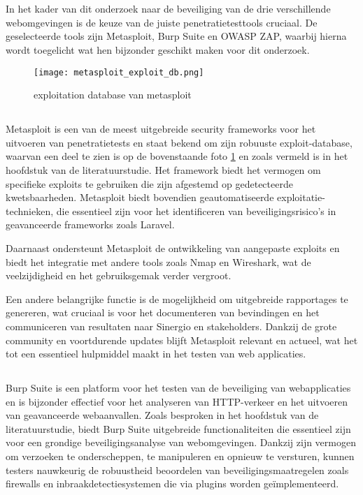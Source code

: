 \section{}
In het kader van dit onderzoek naar de beveiliging van de drie verschillende webomgevingen is de keuze van 
de juiste penetratietesttools cruciaal. De geselecteerde tools zijn 
Metasploit, Burp Suite en OWASP ZAP, waarbij hierna wordt toegelicht wat hen bijzonder geschikt maken voor dit onderzoek.
\begin{figure}
    \centering
    \texttt{[image: metasploit\_exploit\_db.png]}
    \caption[exploitation database van metasploit]{exploitation database van metasploit}
    \label{fig:exploitatie_db}
\end{figure}
\subsection{}
Metasploit is een van de meest uitgebreide security frameworks voor het uitvoeren van penetratietests en staat bekend om 
zijn robuuste exploit-database, waarvan een deel te zien is op de bovenstaande foto \ref{fig:exploitatie_db} en zoals vermeld is in het hoofdstuk  van de 
literatuurstudie. Het framework biedt het vermogen om specifieke exploits te gebruiken die zijn afgestemd op gedetecteerde 
kwetsbaarheden. Metasploit biedt bovendien geautomatiseerde exploitatie-technieken, die essentieel zijn voor het identificeren 
van beveiligingsrisico's in geavanceerde frameworks zoals Laravel. 

Daarnaast ondersteunt Metasploit de ontwikkeling van 
aangepaste exploits en biedt het integratie met andere tools zoals Nmap en Wireshark, wat de veelzijdigheid en het 
gebruiksgemak verder vergroot. 

Een andere belangrijke functie is de mogelijkheid om uitgebreide rapportages te genereren, 
wat cruciaal is voor het documenteren van bevindingen en het communiceren van resultaten naar Sinergio en stakeholders. Dankzij de grote 
community en voortdurende updates blijft Metasploit relevant en actueel, wat het tot een essentieel hulpmiddel maakt in het 
testen van web applicaties.

\subsection{}
Burp Suite is een platform voor het testen van de beveiliging van webapplicaties en is bijzonder effectief voor 
het analyseren van HTTP-verkeer en het uitvoeren van geavanceerde webaanvallen. Zoals besproken in het hoofdstuk  
van de literatuurstudie, biedt Burp Suite uitgebreide functionaliteiten die essentieel zijn voor een grondige beveiligingsanalyse 
van webomgevingen. Dankzij zijn vermogen om verzoeken te onderscheppen, te manipuleren en opnieuw te versturen, kunnen 
testers nauwkeurig de robuustheid beoordelen van beveiligingsmaatregelen zoals firewalls en inbraakdetectiesystemen die via 
plugins worden geïmplementeerd. 

